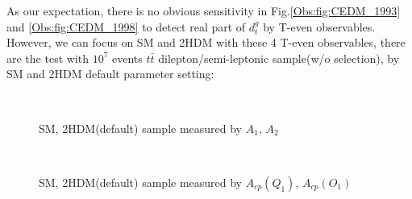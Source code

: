 			As our expectation, there is no obvious sensitivity in Fig.\ref{Obs:fig:CEDM_1993} and \ref{Obs:fig:CEDM_1998} to detect real part of $d_t^g$ by T-even observables. However, we can focus on SM and 2HDM with these 4 T-even observables, there are the test with $10^7$ events $t\bar{t}$ dilepton/semi-leptonic sample(w/o selection), by SM and 2HDM default parameter setting:

			\begin{figure}[H]
			\centering
			    \\
			\caption{SM, 2HDM(default) sample measured by $A_1$, $A_2$}
			\label{Obs:fig:SM_2HDM_1993}
			\end{figure}
			\FloatBarrier

			\begin{figure}[H]
			\centering
			    \\
			\caption{SM, 2HDM(default) sample measured by $A_{cp}(Q_1)$, $A_{cp}(O_1)$}
			\label{Obs:fig:SM_2HDM_1998}
			\end{figure}
			\FloatBarrier


